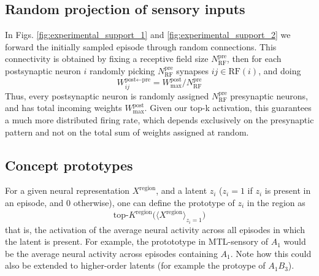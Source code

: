 \documentclass{article}
\begin{document}
\subsection*{Random projection of sensory inputs}
In Figs. \ref{fig:experimental_support_1} and \ref{fig:experimental_support_2} we forward the initially sampled episode through random connections. This connectivity is obtained by fixing a receptive field size $N_\textrm{RF}^\textrm{pre}$, then for each postsynaptic neuron $i$ randomly picking $N_\textrm{RF}^\textrm{pre}$ synapses $ij \in \textrm{RF}(i)$, and doing
\begin{equation}
    W^{\textrm{post}\leftarrow\textrm{pre}}_{ij} = W_\textrm{max}^\textrm{post}/N_\textrm{RF}^\textrm{pre}
\end{equation}
Thus, every postsynaptic neuron is randomly assigned $N_\textrm{RF}^\textrm{pre}$ presynaptic neurons, and has total incoming weights $W_\textrm{max}^\textrm{post}$. Given our top-k activation, this guarantees a much more distributed firing rate, which depends exclusively on the presynaptic pattern and not on the total sum of weights assigned at random.
\subsection*{Concept prototypes}
For a given neural representation $X^\textrm{region}$, and a latent $z_i$ ($z_i = 1$ if $z_i$ is present in an episode, and 0 otherwise), one can define the prototype of $z_i$ in the region as
\begin{equation}
    \textrm{top-}K^\textrm{region}\big(\langle X^\textrm{region} \rangle_{z_i = 1}\big)
    \label{eq:prototype}
\end{equation}
that is, the activation of the average neural activity across all episodes in which the latent is present. For example, the protototype in MTL-sensory of $A_1$ would be the average neural activity across episodes containing $A_1$. Note how this could also be extended to higher-order latents (for example the protoype of $A_1B_3$).
\end{document}
